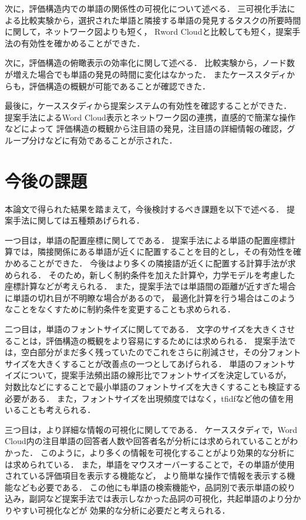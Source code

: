 \documentclass[syuuron]{kuee}
\begin{document}
		次に，評価構造内での単語の関係性の可視化について述べる．
		三可視化手法による比較実験から，選択された単語と隣接する単語の発見するタスクの所要時間に関して，ネットワーク図よりも短く，
		Rword Cloudと比較しても短く，提案手法の有効性を確かめることができた．
		
		次に，評価構造の俯瞰表示の効率化に関して述べる．
		比較実験から，ノード数が増えた場合でも単語の発見の時間に変化はなかった．
		またケーススタディからも，評価構造の概観が可能であることが確認できた．
		
		最後に，ケーススタディから提案システムの有効性を確認することができた．
		提案手法によるWord Cloud表示とネットワーク図の連携，直感的で簡潔な操作などによって
		評価構造の概観から注目語の発見，注目語の詳細情報の確認，グループ分けなどに有効であることが示された．		
		
	\section{今後の課題}
		本論文で得られた結果を踏まえて，今後検討するべき課題を以下で述べる．
		提案手法に関しては五種類あげられる．
		
		一つ目は，単語の配置座標に関してである．
		提案手法による単語の配置座標計算では，隣接関係にある単語が近くに配置することを目的とし，その有効性を確かめることができた．
		今後はより多くの隣接語が近くに配置する計算手法が求められる．
		そのため，新しく制約条件を加えた計算や，力学モデルを考慮した座標計算などが考えられる．
		また，提案手法では単語間の距離が近すぎた場合に単語の切れ目が不明瞭な場合があるので，
		最適化計算を行う場合はこのようなことをなくすために制約条件を変更することも求められる．
		
		二つ目は，単語のフォントサイズに関してである．
		文字のサイズを大きくさせることは，評価構造の概観をより容易にするためには求められる．
		提案手法では，空白部分がまだ多く残っていたのでこれをさらに削減させ，その分フォントサイズを大きくすることが改善点の一つとしてあげられる．
		単語のフォントサイズについて，提案手法頻出語の線形比でフォントサイズを決定しているが，
		対数比などにすることで最小単語のフォントサイズを大きくすることも検証する必要がある．
		また，フォントサイズを出現頻度ではなく，tfidfなど他の値を用いることも考えられる．		
		
		三つ目は，より詳細な情報の可視化に関してである．
		ケーススタディで，Word Cloud内の注目単語の回答者人数や回答者名が分析には求められていることがわかった．
		このように，より多くの情報を可視化することがより効果的な分析には求められている．
		また，単語をマウスオーバーすることで，その単語が使用されている評価項目を表示する機能など，
		より簡単な操作で情報を表示する機能なども必要である．
		この他にも単語の検索機能や，品詞別で表示単語の絞り込み，副詞など提案手法では表示しなかった品詞の可視化，共起単語のより分かりやすい可視化などが
		効果的な分析に必要だと考えられる．
		
\end{document}
